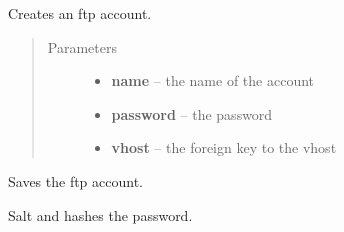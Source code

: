 \documentclass[letterpaper,10pt,english]{sphinxmanual}
\begin{document}
\begin{fulllineitems}
\label{api/ftp:limeade.ftp.models.Account}
Creates an ftp account.
\begin{quote}\begin{description}
\item[{Parameters}] \leavevmode\begin{itemize}
\item {} 
\textbf{name} -- the name of the account

\item {} 
\textbf{password} -- the password

\item {} 
\textbf{vhost} -- the foreign key to the vhost

\end{itemize}

\end{description}\end{quote}

\begin{fulllineitems}
\label{api/ftp:limeade.ftp.models.Account.save}
Saves the ftp account.

\end{fulllineitems}


\begin{fulllineitems}
\label{api/ftp:limeade.ftp.models.Account.set_password}
Salt and hashes the password.

\end{fulllineitems}


\end{fulllineitems}

\end{document}
